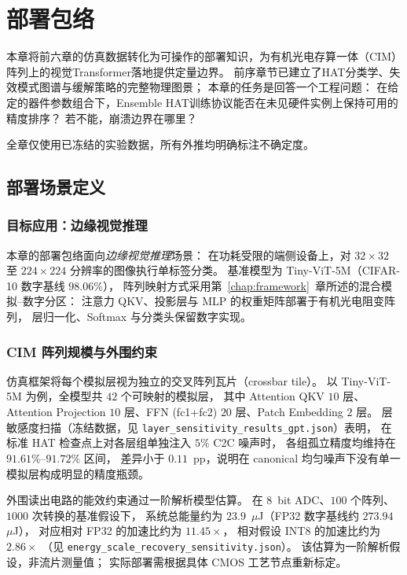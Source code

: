 \chapter{部署包络}
\label{chap:deployment-envelope}

本章将前六章的仿真数据转化为可操作的部署知识，为有机光电存算一体（CIM）阵列上的视觉Transformer落地提供定量边界。
前序章节已建立了HAT分类学、失效模式图谱与缓解策略的完整物理图景；
本章的任务是回答一个工程问题：
在给定的器件参数组合下，Ensemble HAT训练协议能否在未见硬件实例上保持可用的精度排序？
若不能，崩溃边界在哪里？

全章仅使用已冻结的实验数据，所有外推均明确标注不确定度。

\section{部署场景定义}
\label{sec:deployment-scenario}

\subsection{目标应用：边缘视觉推理}

本章的部署包络面向\emph{边缘视觉推理}场景：
在功耗受限的端侧设备上，对 $32\times32$ 至 $224\times224$ 分辨率的图像执行单标签分类。
基准模型为 Tiny-ViT-5M（CIFAR-10 数字基线 $98.06\%$），
阵列映射方式采用第~\ref{chap:framework}~章所述的混合模拟--数字分区：
注意力 QKV、投影层与 MLP 的权重矩阵部署于有机光电阻变阵列，
层归一化、Softmax 与分类头保留数字实现。

\subsection{CIM 阵列规模与外围约束}

仿真框架将每个模拟层视为独立的交叉阵列瓦片（crossbar tile）。
以 Tiny-ViT-5M 为例，全模型共 $42$ 个可映射的模拟层，
其中 Attention QKV $10$ 层、Attention Projection $10$ 层、FFN (fc1+fc2) $20$ 层、Patch Embedding $2$ 层。
层敏感度扫描（冻结数据，见 \texttt{layer\_sensitivity\_results\_gpt.json}）表明，
在标准 HAT 检查点上对各层组单独注入 $5\%$ C2C 噪声时，
各组孤立精度均维持在 $91.61\%$--$91.72\%$ 区间，
差异小于 $0.11$~pp，说明在 canonical 均匀噪声下没有单一模拟层构成明显的精度瓶颈。

外围读出电路的能效约束通过一阶解析模型估算。
在 $8$~bit ADC、$100$ 个阵列、$1000$ 次转换的基准假设下，
系统总能量约为 $23.9$~$\mu$J（FP32 数字基线约 $273.94$~$\mu$J），
对应相对 FP32 的加速比约为 $11.45\times$，
相对假设 INT8 的加速比约为 $2.86\times$
（见 \texttt{energy\_scale\_recovery\_sensitivity.json}）。
该估算为一阶解析假设，非流片测量值；
实际部署需根据具体 CMOS 工艺节点重新标定。

